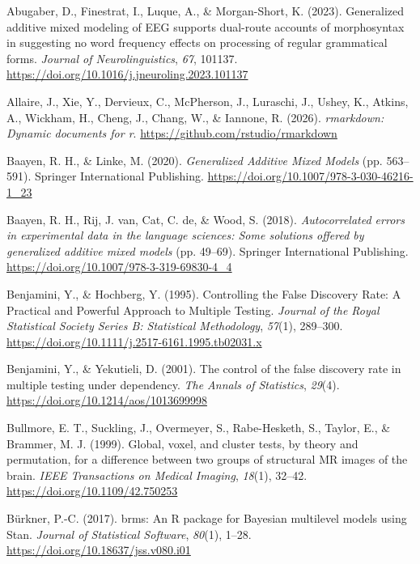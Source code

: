 \documentclass[
  doc,
  floatsintext,
  longtable,
  a4paper,
  nolmodern,
  notxfonts,
  notimes,
  colorlinks=true,linkcolor=blue,citecolor=blue,urlcolor=blue]{apa7}
\newlength{\cslhangindent}
\newenvironment{CSLReferences}[2] %
 {\begin{list}{}{%
  \setlength{\itemindent}{0pt}
  \setlength{\leftmargin}{0pt}
  \setlength{\parsep}{0pt}
  \ifodd #1
   \setlength{\leftmargin}{\cslhangindent}
   \setlength{\itemindent}{-1\cslhangindent}
  \fi
  \setlength{\itemsep}{#2\baselineskip}}}
 {\end{list}}
\begin{document}
\label{refs}
\begin{CSLReferences}{1}{0}
Abugaber, D., Finestrat, I., Luque, A., \& Morgan-Short, K. (2023).
Generalized additive mixed modeling of EEG supports dual-route accounts
of morphosyntax in suggesting no word frequency effects on processing of
regular grammatical forms. \emph{Journal of Neurolinguistics},
\emph{67}, 101137.
\url{https://doi.org/10.1016/j.jneuroling.2023.101137}

Allaire, J., Xie, Y., Dervieux, C., McPherson, J., Luraschi, J., Ushey,
K., Atkins, A., Wickham, H., Cheng, J., Chang, W., \& Iannone, R.
(2026). \emph{{rmarkdown}: Dynamic documents for r}.
\url{https://github.com/rstudio/rmarkdown}

Baayen, R. H., \& Linke, M. (2020). \emph{Generalized Additive Mixed
Models} (pp. 563--591). Springer International Publishing.
\url{https://doi.org/10.1007/978-3-030-46216-1_23}

Baayen, R. H., Rij, J. van, Cat, C. de, \& Wood, S. (2018).
\emph{Autocorrelated errors in experimental data in the language
sciences: Some solutions offered by generalized additive mixed models}
(pp. 49--69). Springer International Publishing.
\url{https://doi.org/10.1007/978-3-319-69830-4_4}

Benjamini, Y., \& Hochberg, Y. (1995). Controlling the False Discovery
Rate: A Practical and Powerful Approach to Multiple Testing.
\emph{Journal of the Royal Statistical Society Series B: Statistical
Methodology}, \emph{57}(1), 289--300.
\url{https://doi.org/10.1111/j.2517-6161.1995.tb02031.x}

Benjamini, Y., \& Yekutieli, D. (2001). The control of the false
discovery rate in multiple testing under dependency. \emph{The Annals of
Statistics}, \emph{29}(4). \url{https://doi.org/10.1214/aos/1013699998}

Bullmore, E. T., Suckling, J., Overmeyer, S., Rabe-Hesketh, S., Taylor,
E., \& Brammer, M. J. (1999). Global, voxel, and cluster tests, by
theory and permutation, for a difference between two groups of
structural MR images of the brain. \emph{IEEE Transactions on Medical
Imaging}, \emph{18}(1), 32--42. \url{https://doi.org/10.1109/42.750253}

Bürkner, P.-C. (2017). {brms}: An {R} package for {Bayesian} multilevel
models using {Stan}. \emph{Journal of Statistical Software},
\emph{80}(1), 1--28. \url{https://doi.org/10.18637/jss.v080.i01}


\end{CSLReferences}
\end{document}
